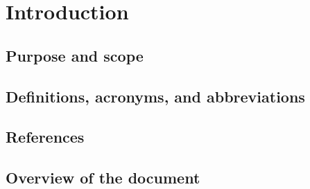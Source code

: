 \chapter{Introduction}\label{chap:introduction}


\section{Purpose and scope}
\lipsum[2]


\section{Definitions, acronyms, and abbreviations}
\lipsum[2]


\section{References}\label{sec:references}
\lipsum[2]


\section{Overview of the document} 
\lipsum[2]





